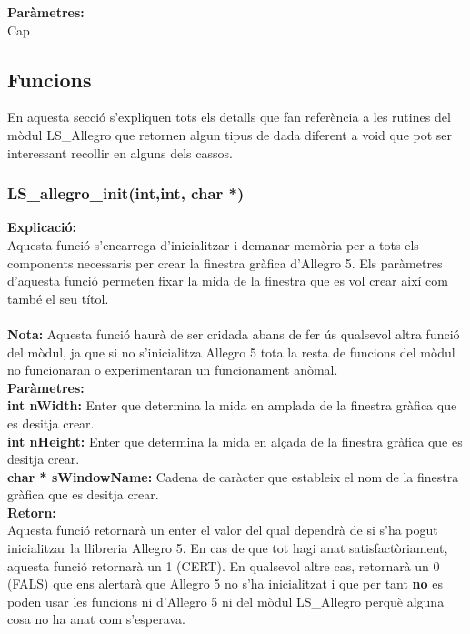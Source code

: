 \documentclass[11pt]{article}
\begin{document}
\noindent \textbf{Paràmetres:}\\ Cap

\pagebreak
\subsection{Funcions}
En aquesta secció s'expliquen tots els detalls que fan referència a les rutines del mòdul LS\_Allegro que retornen algun tipus de dada diferent a void que pot ser interessant recollir en alguns dels cassos.

\subsubsection{LS\_allegro\_init(int,int, char *)}
\textbf{Explicació:}\\
Aquesta funció s'encarrega d'inicialitzar i demanar memòria per a tots els components necessaris per crear la finestra gràfica d'Allegro 5. Els paràmetres d'aquesta funció permeten fixar la mida de la finestra que es vol crear així com també el seu títol.\\\\
\textbf{Nota:} Aquesta funció haurà de ser cridada abans de fer ús qualsevol altra funció del mòdul, ja que si no s'inicialitza Allegro 5 tota la resta de funcions del mòdul no funcionaran o experimentaran un funcionament anòmal.\\

\noindent \textbf{Paràmetres:}\\
\textbf{int nWidth:} Enter que determina la mida en amplada de la finestra gràfica que es desitja crear.\\
\textbf{int nHeight:} Enter que determina la mida en alçada de la finestra gràfica que es desitja crear.\\
\textbf{char * sWindowName: } Cadena de caràcter que estableix el nom de la finestra gràfica que es desitja crear.\\

\noindent \textbf{Retorn:}\\
Aquesta funció retornarà un enter el valor del qual dependrà de si s'ha pogut inicialitzar la llibreria Allegro 5. En cas de que tot hagi anat satisfactòriament, aquesta funció retornarà un 1 (CERT). En qualsevol altre cas, retornarà un 0 (FALS) que ens alertarà que Allegro 5 no s'ha inicialitzat i que per tant \textbf{no} es poden usar les funcions ni d'Allegro 5 ni del mòdul LS\_Allegro perquè alguna cosa no ha anat com s'esperava.

\pagebreak
\end{document}
